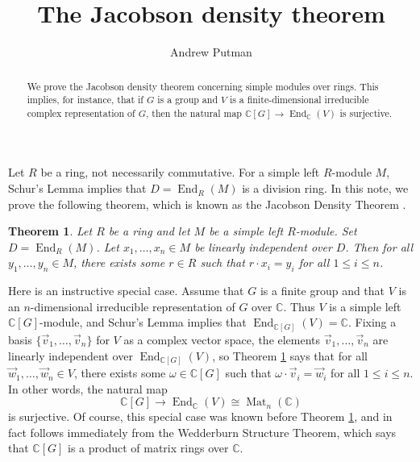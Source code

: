 \documentclass[11pt]{article}
\title{\vspace{-50pt}The Jacobson density theorem}
\author{Andrew Putman\vspace{-6pt}}
\date{}
\numberwithin{equation}{section}
\theoremstyle{plain}
\newtheorem{maintheorem}{Theorem}
\theoremstyle{definition}
\DeclareMathOperator{\Mat}{Mat}
\DeclareMathOperator{\End}{End}
\newcommand\C{\ensuremath{\mathbb{C}}}
\begin{document}
\maketitle

\begin{abstract}
We prove the Jacobson density theorem concerning simple modules over rings.  This
implies, for instance, that if $G$ is a group and $V$ is a finite-dimensional
irreducible complex representation of $G$, then the natural map
$\C[G] \rightarrow \End_{\C}(V)$ is surjective.
\end{abstract}

Let $R$ be a ring, not necessarily commutative.  For a simple left $R$-module $M$,
Schur's Lemma implies that $D = \End_R(M)$ is a division ring.  In this note,
we prove the following theorem, which is known as the Jacobson Density Theorem \cite{Jacobson}.

\begin{maintheorem}
\label{theorem:jacobson}
Let $R$ be a ring and let $M$ be a simple left $R$-module.  Set $D = \End_R(M)$.  Let
$x_1,\ldots,x_n \in M$ be linearly independent over $D$.  Then for all
$y_1,\ldots,y_n \in M$, there exists some $r \in R$ such that $r \cdot x_i = y_i$
for all $1 \leq i \leq n$.
\end{maintheorem}

Here is an instructive special case.  Assume that $G$ is a finite group and
that $V$ is an $n$-dimensional irreducible representation of $G$ over $\C$.
Thus $V$ is a simple left $\C[G]$-module, and Schur's Lemma implies that
$\End_{\C[G]}(V) = \C$.  Fixing
a basis $\{\vec{v}_1,\ldots,\vec{v}_n\}$ for $V$ as a complex vector space,
the elements $\vec{v}_1,\ldots,\vec{v}_n$ are linearly independent over $\End_{\C[G]}(V)$,
so Theorem \ref{theorem:jacobson} says that for all $\vec{w}_1,\ldots,\vec{w}_n \in V$,
there exists some $\omega \in \C[G]$ such that $\omega \cdot \vec{v}_i = \vec{w}_i$ for
all $1 \leq i \leq n$.  In other words, the natural map
\[\C[G] \longrightarrow \End_{\C}(V) \cong \Mat_n(\C)\]
is surjective.  Of course, this special case was known before Theorem
\ref{theorem:jacobson}, and in fact follows immediately from the
Wedderburn Structure Theorem, which says that $\C[G]$ is a product
of matrix rings over $\C$.
\end{document}
